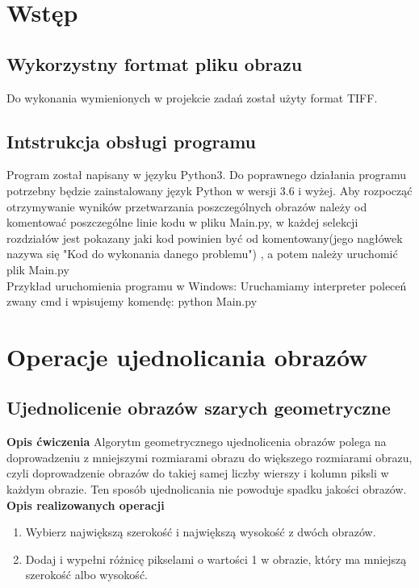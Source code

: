 \documentclass[magisterska,openany]{pracadypl}
\begin{document}
\chapter{Wstęp}
\section{Wykorzystny fortmat pliku obrazu}
Do wykonania wymienionych w projekcie zadań został użyty format TIFF.

\section{Intstrukcja obsługi programu}
Program został napisany w języku Python3. Do poprawnego działania programu potrzebny będzie zainstalowany język Python w wersji 3.6 i wyżej. Aby rozpocząć otrzymywanie wyników przetwarzania poszczególnych obrazów należy od komentować poszczególne linie kodu w pliku Main.py, w każdej selekcji rozdziałów jest pokazany jaki kod powinien być od komentowany(jego nagłówek nazywa się "Kod do wykonania danego problemu") , a potem należy uruchomić plik Main.py
\\Przykład uruchomienia programu w Windows: Uruchamiamy interpreter poleceń zwany cmd i wpisujemy komendę: python Main.py


\chapter{Operacje ujednolicania obrazów}
\section{Ujednolicenie obrazów szarych geometryczne}

\vspace{0.5cm}\textbf{\Large Opis ćwiczenia}
\vspace{0.25cm}\newline
Algorytm geometrycznego ujednolicenia obrazów polega na doprowadzeniu z mniejszymi rozmiarami obrazu do większego rozmiarami obrazu, czyli doprowadzenie obrazów do takiej samej liczby wierszy i kolumn piksli w każdym obrazie.
Ten sposób ujednolicania nie powoduje spadku jakości obrazów.
\newline
\newline
\textbf{\Large Opis realizowanych operacji}
\begin{enumerate}
\item Wybierz największą szerokość i największą wysokość z dwóch obrazów.
\item Dodaj i wypełni różnicę pikselami o wartości 1 w obrazie, który ma mniejszą szerokość albo wysokość.
\end{enumerate}
\end{document}
